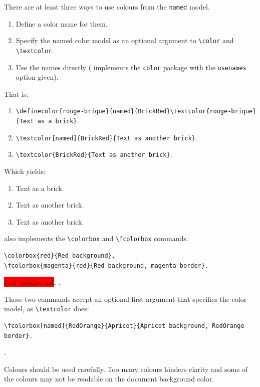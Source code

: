 There are at least three ways to use colours from the \texttt{named}
 model.
\begin{enumerate}
\item Define a color name for them.
\item Specify the named color model as an optional argument to
 \verb+\color+ and \verb+\textcolor+.
\item Use the names directly
(\hevea{} implements the \texttt{color} package with
the \texttt{usenames} option given).
\end{enumerate}
That is:
\begin{enumerate}
\item
\verb+\definecolor{rouge-brique}{named}{BrickRed}\textcolor{rouge-brique}{Text as a brick}+.
\item \verb+\textcolor[named]{BrickRed}{Text as another brick}+.
\item \verb+\textcolor{BrickRed}{Text as another brick}+.
\end{enumerate}
\ifhevea Which yields:
\begin{enumerate}
\item {}
\textcolor{rouge-brique}{Text as a brick}.
\item \textcolor[named]{BrickRed}{Text as another brick}.
\item \textcolor{BrickRed}{Text as another brick}.
\end{enumerate}\fi


%
\hevea{} also implements the \verb+\colorbox+ and \verb+\fcolorbox+ commands.
\begin{verbatim}
\colorbox{red}{Red background},
\fcolorbox{magenta}{red}{Red background, magenta border}.
\end{verbatim}
\begin{center}
\colorbox{red}{Red background},
.
\end{center}
Those two commands accept an optional first argument that specifies
the color model, as \verb+\textcolor+ does:
\begin{verbatim}
\fcolorbox[named]{RedOrange}{Apricot}{Apricot background, RedOrange border}.
\end{verbatim}
\begin{center}
.
\end{center}

Colours should be used carefully. Too many colours
hinders clarity and some of the colours may not be readable on the
document background color.

